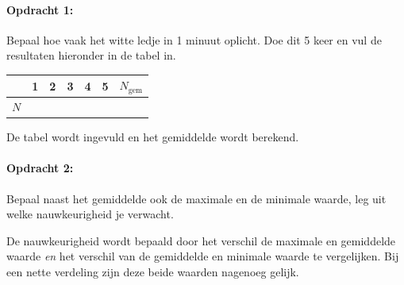 \begin{minipage}[t]{1\columnwidth}%

\paragraph{Opdracht 1:}

Bepaal hoe vaak het witte ledje in 1 minuut oplicht. Doe dit 5 keer
en vul de resultaten hieronder in de tabel in.

\smallskip{}


\begin{tabular}{|x{.11\textwidth}|x{.11\textwidth}|x{.11\textwidth}
                |x{.11\textwidth}|x{.11\textwidth}|x{.11\textwidth}
                |x{.11\textwidth}|}
     & 1 & 2 & 3 & 4 & 5 & $N_\textrm{gem}$\\
    \hline 
    $N$ &  &  &  &  &  & \tabularnewline
    \hline 
\end{tabular}%

\smallskip{}

De tabel wordt ingevuld en het gemiddelde wordt berekend.%
\end{minipage}

\bigskip{}

\begin{minipage}[t]{1\columnwidth}%

\paragraph{Opdracht 2:}

Bepaal naast het gemiddelde ook de maximale en de minimale
waarde, leg uit welke nauwkeurigheid je verwacht.

De nauwkeurigheid wordt bepaald door het verschil de maximale en gemiddelde
waarde \textit{en} het verschil van de gemiddelde en minimale waarde
te vergelijken. Bij een nette verdeling zijn deze beide waarden nagenoeg
gelijk.%
\end{minipage}

\bigskip{}


